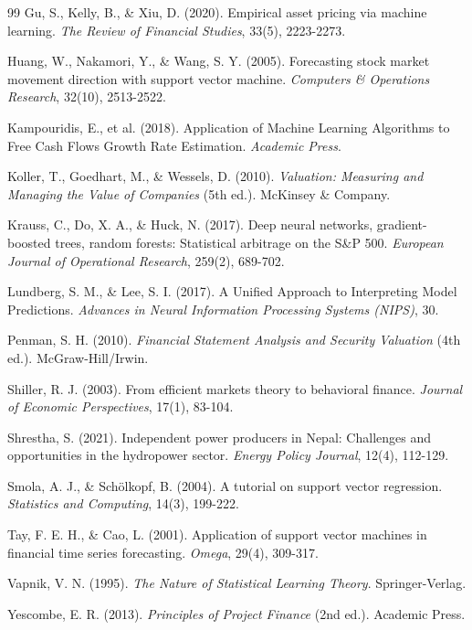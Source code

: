 \documentclass[11pt,a4paper]{article}
\begin{document}
\begin{thebibliography}{99}
Gu, S., Kelly, B., \& Xiu, D. (2020). Empirical asset pricing via machine learning. \textit{The Review of Financial Studies}, 33(5), 2223-2273.

Huang, W., Nakamori, Y., \& Wang, S. Y. (2005). Forecasting stock market movement direction with support vector machine. \textit{Computers \& Operations Research}, 32(10), 2513-2522.

Kampouridis, E., et al. (2018). Application of Machine Learning Algorithms to Free Cash Flows Growth Rate Estimation. \textit{Academic Press}.

Koller, T., Goedhart, M., \& Wessels, D. (2010). \textit{Valuation: Measuring and Managing the Value of Companies} (5th ed.). McKinsey \& Company.

Krauss, C., Do, X. A., \& Huck, N. (2017). Deep neural networks, gradient-boosted trees, random forests: Statistical arbitrage on the S\&P 500. \textit{European Journal of Operational Research}, 259(2), 689-702.

Lundberg, S. M., \& Lee, S. I. (2017). A Unified Approach to Interpreting Model Predictions. \textit{Advances in Neural Information Processing Systems (NIPS)}, 30.

Penman, S. H. (2010). \textit{Financial Statement Analysis and Security Valuation} (4th ed.). McGraw-Hill/Irwin.

Shiller, R. J. (2003). From efficient markets theory to behavioral finance. \textit{Journal of Economic Perspectives}, 17(1), 83-104.

Shrestha, S. (2021). Independent power producers in Nepal: Challenges and opportunities in the hydropower sector. \textit{Energy Policy Journal}, 12(4), 112-129.

Smola, A. J., \& Schölkopf, B. (2004). A tutorial on support vector regression. \textit{Statistics and Computing}, 14(3), 199-222.

Tay, F. E. H., \& Cao, L. (2001). Application of support vector machines in financial time series forecasting. \textit{Omega}, 29(4), 309-317.

Vapnik, V. N. (1995). \textit{The Nature of Statistical Learning Theory}. Springer-Verlag.

Yescombe, E. R. (2013). \textit{Principles of Project Finance} (2nd ed.). Academic Press.

\end{thebibliography}
\end{document}
